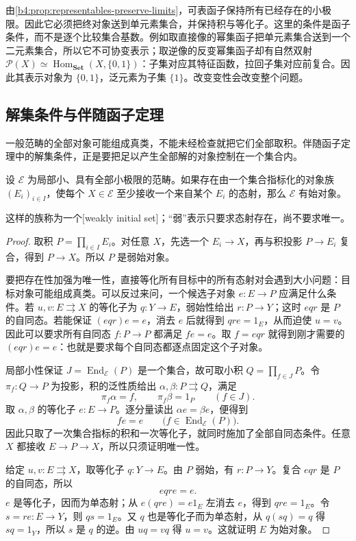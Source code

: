 \ProseParagraphBreak

由\cref{b4:prop:representables-preserve-limits}，可表函子保持所有已经存在的小极限。因此它必须把终对象送到单元素集合，并保持积与等化子。这里的条件是函子条件，而不是逐个比较集合基数。例如取直接像的幂集函子把单元素集合送到一个二元素集合，所以它不可协变表示；取逆像的反变幂集函子却有自然双射 \(\mathcal P(X)\simeq\operatorname{Hom}_{\mathbf{Set}}(X,\{0,1\})\)：子集对应其特征函数，拉回子集对应前复合。因此其表示对象为 \(\{0,1\}\)，泛元素为子集 \(\{1\}\)。改变变性会改变整个问题。

\subsection{解集条件与伴随函子定理}
\label{b4:subsec:A04:02}

一般范畴的全部对象可能组成真类，不能未经检查就把它们全部取积。伴随函子定理中的解集条件，正是要把足以产生全部解的对象控制在一个集合内。

\begin{lemma}\label{b4:lem:A-weakly-initial-set}
	设 \(\mathcal E\) 为局部小、具有全部小极限的范畴。如果存在由一个集合指标化的对象族 \((E_i)_{i\in I}\)，使每个 \(X\in\mathcal E\) 至少接收一个来自某个 \(E_i\) 的态射，那么 \(\mathcal E\) 有始对象。
\end{lemma}
这样的族称为一个[weakly initial set]；“弱”表示只要求态射存在，尚不要求唯一。
\begin{proof}
	取积 \(P=\prod_{i\in I}E_i\)。对任意 \(X\)，先选一个 \(E_i\to X\)，再与积投影 \(P\to E_i\) 复合，得到 \(P\to X\)。所以 \(P\) 是弱始对象。

	要把存在性加强为唯一性，直接等化所有目标中的所有态射对会遇到大小问题：目标对象可能组成真类。可以反过来问，一个候选子对象 \(e:E\to P\) 应满足什么条件。若 \(u,v:E\rightrightarrows X\) 的等化子为 \(q:Y\to E\)，弱始性给出 \(r:P\to Y\)；这时 \(eqr\) 是 \(P\) 的自同态。若能保证 \((eqr)e=e\)，消去 \(e\) 后就得到 \(qre=1_E\)，从而迫使 \(u=v\)。因此可以要求所有自同态 \(f:P\to P\) 都满足 \(fe=e\)。取 \(f=eqr\) 就得到刚才需要的 \((eqr)e=e\)：也就是要求每个自同态都逐点固定这个子对象。

	局部小性保证 \(J=\operatorname{End}_{\mathcal E}(P)\) 是一个集合，故可取小积 \(Q=\prod_{f\in J}P\)。令 \(\pi_f:Q\to P\) 为投影，积的泛性质给出 \(\alpha,\beta:P\rightrightarrows Q\)，满足
	\[
		\pi_f\alpha=f,\qquad \pi_f\beta=1_P\qquad(f\in J).
	\]
	取 \(\alpha,\beta\) 的等化子 \(e:E\to P\)。逐分量读出 \(\alpha e=\beta e\)，便得到
	\[
		fe=e\qquad\bigl(f\in\operatorname{End}_{\mathcal E}(P)\bigr).
	\]
	因此只取了一次集合指标的积和一次等化子，就同时施加了全部自同态条件。任意 \(X\) 都接收 \(E\to P\to X\)，所以只须证明唯一性。

	给定 \(u,v:E\rightrightarrows X\)，取等化子 \(q:Y\to E\)。由 \(P\) 弱始，有 \(r:P\to Y\)。复合 \(eqr\) 是 \(P\) 的自同态，所以
	\[
		eqre=e.
	\]
	\(e\) 是等化子，因而为单态射；从 \(e(qre)=e1_E\) 左消去 \(e\)，得到 \(qre=1_E\)。令 \(s=re:E\to Y\)，则 \(qs=1_E\)。又 \(q\) 也是等化子而为单态射，从 \(q(sq)=q\) 得 \(sq=1_Y\)，所以 \(s\) 是 \(q\) 的逆。由 \(uq=vq\) 得 \(u=v\)。这就证明 \(E\) 为始对象。
\end{proof}

